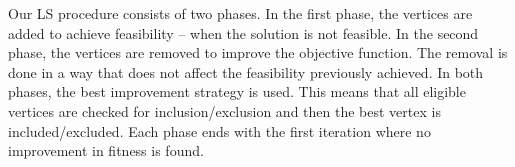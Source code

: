 \documentclass[dvipsnames,format=sigconf]{acmart} %
\begin{document}
\begin{comment}
    The LS tailored to MkDP is described in Algorithm~\ref{alg:ls}.

  \begin{algorithm}[!t] 
  	\caption{\texttt{LocalSearch}}\label{alg:ls}
  	\begin{algorithmic}[1]
  		\STATE \textbf{Input}: a solution $D$
  		\STATE \textbf{Output}: a (possibly) improved solution $D_{best}$
  		\STATE $D_{best} \gets D$
  		\STATE $best_{fit} \gets fitness(D_{best})$
 		\\//\, first, achieve feasibility by adding vertices
 		\STATE improved $\gets$ True
  		\WHILE{\emph{improved}}
  		     \STATE $improved \gets  False$
  		     \STATE $best_{v} \gets$ None
  		     \FOR{$v \in V \setminus D_{best}$}
  		          \STATE $D' \gets D_{best} \cup \{v\}$
  		          \IF{$new_{fit} = fitness_{fast}(D') < best_{fit}$}
  		              \STATE $best_v \gets v$
  		              \STATE $best_{fit} \gets new_{fit}$
  		              \STATE $improved \gets True$
  		          \ENDIF
  		     \ENDFOR
  		     \IF{\emph{improved}}
  		         \STATE $D_{best} \gets D_{best} \cup \{best_v\}$
  		     \ENDIF

  		\ENDWHILE   	
  		\\ //\, second, remove vertices, but keep the feasibility	    
  		 \STATE  $improved \gets True$
  		 \WHILE{\emph{improved}}
  		   \STATE $improved \gets  False$
  		    \STATE $best_{v} \gets$ None
  		    \FOR{$v \in D_{best}$}
  		       \STATE $D' \gets D_{best} \setminus \{v\}$
  		        \IF{$new_{fit} = fitness_{fast}(D') < best_{fit}$}
  		             \STATE $best_v \gets v$
  		             \STATE $best_{fit} \gets new_{fit}$	              
  		             \STATE $improved \gets True$
  		       \ENDIF
  		        \IF{\emph{improved}}
  		      		 \STATE $D_{best} \gets D_{best} \setminus \{best_v\}$
  		       \ENDIF
  		       
  		    \ENDFOR
  		\ENDWHILE
  		\STATE return $D_{best}$
  	\end{algorithmic}
\end{algorithm}
\end{comment}


Our LS procedure consists of two phases. In the first phase, the vertices are added to achieve feasibility -- when the solution is not feasible. In the second phase, the vertices are removed to improve the objective function. The removal is done in a way that does not affect the feasibility previously achieved. 
In both phases, the best improvement strategy is used. This means that all eligible vertices are checked for inclusion/exclusion and then the best vertex is included/excluded. 
Each phase ends with the first iteration where no improvement in fitness is found.  
\end{document}
